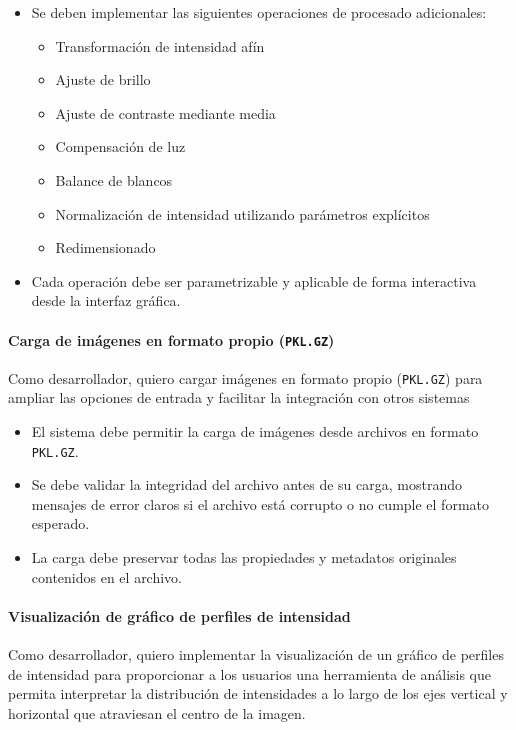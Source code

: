 \begin{itemize}[noitemsep]
	\item Se deben implementar las siguientes operaciones de procesado adicionales:
	\begin{itemize}[noitemsep]
		\item Transformación de intensidad afín
		\item Ajuste de brillo
		\item Ajuste de contraste mediante media
		\item Compensación de luz
		\item Balance de blancos
		\item Normalización de intensidad utilizando parámetros explícitos
		\item Redimensionado
	\end{itemize}
	\item Cada operación debe ser parametrizable y aplicable de forma interactiva desde la interfaz gráfica.
\end{itemize}

\paragraph{Carga de imágenes en formato propio (\texttt{PKL.GZ})} \label{hist:carga_imagenes_formato_propio}
Como desarrollador, quiero cargar imágenes en formato propio (\texttt{PKL.GZ}) para ampliar las opciones 
de entrada y facilitar la integración con otros sistemas

\begin{itemize}[noitemsep]
	\item El sistema debe permitir la carga de imágenes desde archivos en formato \texttt{PKL.GZ}.
	\item Se debe validar la integridad del archivo antes de su carga, mostrando mensajes de error claros si el archivo está corrupto o no cumple el formato esperado.
	\item La carga debe preservar todas las propiedades y metadatos originales contenidos en el archivo.
\end{itemize}

\newpage

\paragraph{Visualización de gráfico de perfiles de intensidad} \label{hist:visualizacion_grafico_perfiles_intensidad}
Como desarrollador, quiero implementar la visualización de un gráfico de perfiles de intensidad para proporcionar a
los usuarios una herramienta de análisis que permita interpretar la distribución de intensidades a lo largo de los ejes
vertical y horizontal que atraviesan el centro de la imagen.

